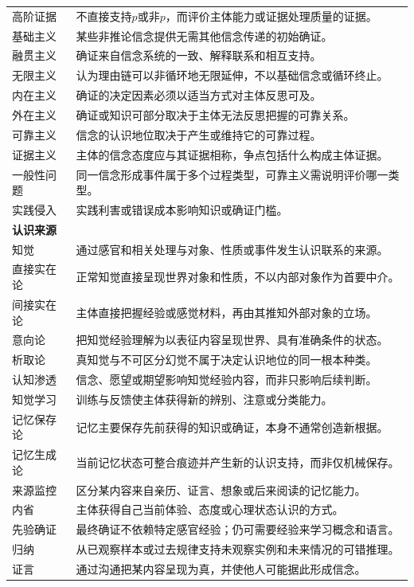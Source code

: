 \begin{longtable}{p{}p{}}
高阶证据 & 不直接支持$p$或非$p$，而评价主体能力或证据处理质量的证据。\\
基础主义 & 某些非推论信念提供无需其他信念传递的初始确证。\\
融贯主义 & 确证来自信念系统的一致、解释联系和相互支持。\\
无限主义 & 认为理由链可以非循环地无限延伸，不以基础信念或循环终止。\\
内在主义 & 确证的决定因素必须以适当方式对主体反思可及。\\
外在主义 & 确证或知识可部分取决于主体无法反思把握的可靠关系。\\
可靠主义 & 信念的认识地位取决于产生或维持它的可靠过程。\\
证据主义 & 主体的信念态度应与其证据相称，争点包括什么构成主体证据。\\
一般性问题 & 同一信念形成事件属于多个过程类型，可靠主义需说明评价哪一类型。\\
实践侵入 & 实践利害或错误成本影响知识或确证门槛。\\
\multicolumn{2}{l}{\textbf{认识来源}}\\
知觉 & 通过感官和相关处理与对象、性质或事件发生认识联系的来源。\\
直接实在论 & 正常知觉直接呈现世界对象和性质，不以内部对象作为首要中介。\\
间接实在论 & 主体直接把握经验或感觉材料，再由其推知外部对象的立场。\\
意向论 & 把知觉经验理解为以表征内容呈现世界、具有准确条件的状态。\\
析取论 & 真知觉与不可区分幻觉不属于决定认识地位的同一根本种类。\\
认知渗透 & 信念、愿望或期望影响知觉经验内容，而非只影响后续判断。\\
知觉学习 & 训练与反馈使主体获得新的辨别、注意或分类能力。\\
记忆保存论 & 记忆主要保存先前获得的知识或确证，本身不通常创造新根据。\\
记忆生成论 & 当前记忆状态可整合痕迹并产生新的认识支持，而非仅机械保存。\\
来源监控 & 区分某内容来自亲历、证言、想象或后来阅读的记忆能力。\\
内省 & 主体获得自己当前体验、态度或心理状态认识的方式。\\
先验确证 & 最终确证不依赖特定感官经验；仍可需要经验来学习概念和语言。\\
归纳 & 从已观察样本或过去规律支持未观察实例和未来情况的可错推理。\\
证言 & 通过沟通把某内容呈现为真，并使他人可能据此形成信念。\\

\end{longtable}
